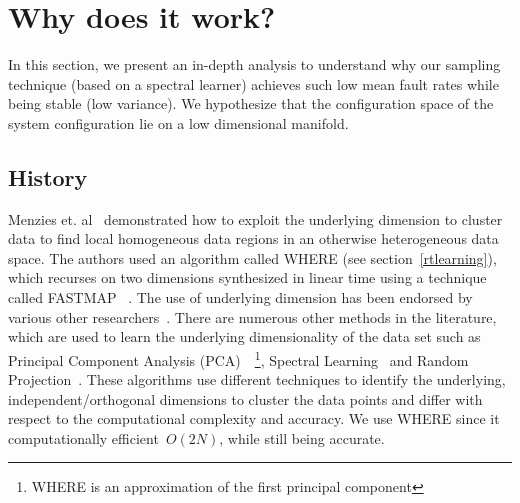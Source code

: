 \documentclass[smallextended]{svjour3}       %
\begin{document}
\section{Why does it work?}
In this section, we present an in-depth analysis to understand why our sampling technique (based on a spectral learner) achieves such low mean fault rates while being stable (low variance). We hypothesize that the configuration space of the system configuration lie on a low dimensional manifold. 

\subsection{History}
Menzies et. al~\cite{me12d}  demonstrated how to exploit the underlying dimension to cluster data to find local homogeneous data regions in an otherwise heterogeneous data space. The authors used an algorithm called WHERE (see section~\ref{rtlearning}), which recurses on two dimensions synthesized in linear time using a technique called FASTMAP ~\cite{Faloutsos1995}. The use of underlying dimension has been endorsed by various other researchers~\cite{bettenburg2012think, deiters2013using, bettenburg2015towards, zhang2016cross}. There are numerous other methods in the literature, which are used to learn the underlying dimensionality of the data set such as Principal Component Analysis (PCA)~\cite{jolliffe2002principal}~\footnote{WHERE is an approximation of the first principal component}, Spectral Learning~\cite{shi2000normalized} and Random Projection~\cite{bingham2001random}.  These algorithms  use  different techniques to identify the underlying, independent/orthogonal dimensions to cluster the data points and differ with respect to the computational complexity and accuracy. We use WHERE since it computationally efficient~$O(2N)$, while still being accurate.
\end{document}
